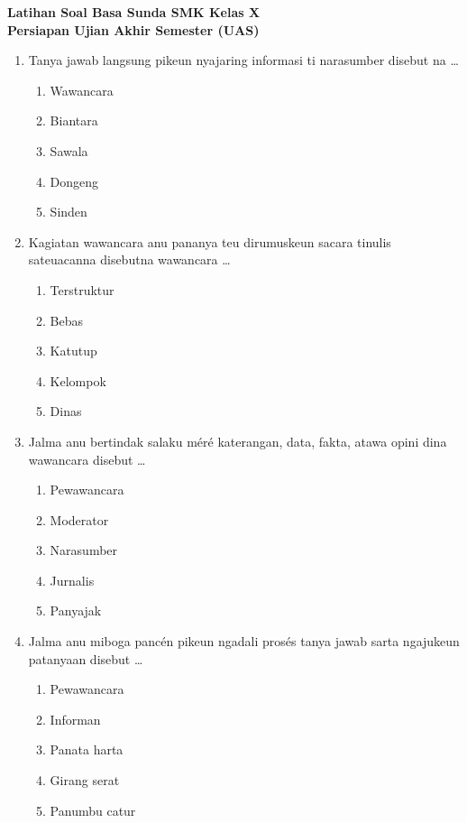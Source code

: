 \documentclass[12pt,a4paper]{article}
\begin{document}
\begin{center}
    \textbf{\Large Latihan Soal Basa Sunda SMK Kelas X} \\
    \textbf{Persiapan Ujian Akhir Semester (UAS)}
\end{center}
\vspace{0.5cm}

\begin{enumerate}[leftmargin=*]

\item Tanya jawab langsung pikeun nyajaring informasi ti narasumber disebut na \dots
    \begin{enumerate}[label=\alph*.]
        \item Wawancara
        \item Biantara
        \item Sawala
        \item Dongeng
        \item Sinden
    \end{enumerate}

\item Kagiatan wawancara anu pananya teu dirumuskeun sacara tinulis sateuacanna disebutna wawancara \dots
    \begin{enumerate}[label=\alph*.]
        \item Terstruktur
        \item Bebas
        \item Katutup
        \item Kelompok
        \item Dinas
    \end{enumerate}

\item Jalma anu bertindak salaku méré katerangan, data, fakta, atawa opini dina wawancara disebut \dots
    \begin{enumerate}[label=\alph*.]
        \item Pewawancara
        \item Moderator
        \item Narasumber
        \item Jurnalis
        \item Panyajak
    \end{enumerate}

\item Jalma anu miboga pancén pikeun ngadali prosés tanya jawab sarta ngajukeun patanyaan disebut \dots
    \begin{enumerate}[label=\alph*.]
        \item Pewawancara
        \item Informan
        \item Panata harta
        \item Girang serat
        \item Panumbu catur
    \end{enumerate}


\end{enumerate}
\end{document}
